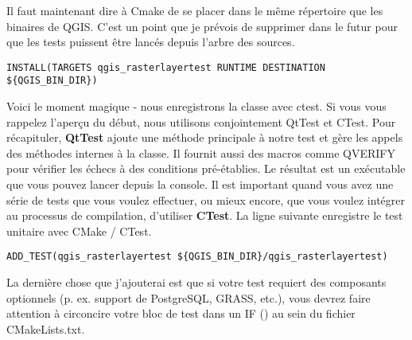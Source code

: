 Il faut maintenant dire \`a Cmake de se placer dans le m\^eme r\'epertoire que les binaires de QGIS. C'est un point que je pr\'evois de supprimer dans le futur pour que les tests puissent \^etre lanc\'es depuis l'arbre des sources.

\begin{verbatim}
INSTALL(TARGETS qgis_rasterlayertest RUNTIME DESTINATION ${QGIS_BIN_DIR})
\end{verbatim}

Voici le moment magique - nous enregistrons la classe avec ctest. Si vous vous rappelez l'aper\c{c}u du d\'ebut, nous utilisons conjointement QtTest et CTest. Pour r\'ecapituler, \textbf{QtTest} ajoute une m\'ethode principale \`a notre test et g\`ere les appels des m\'ethodes internes \`a la classe. Il fournit aussi des macros comme QVERIFY pour v\'erifier les \'echecs \`a des conditions pr\'e-\'etablies. Le r\'esultat est un ex\'ecutable que vous pouvez lancer depuis la console. Il est important quand vous avez une s\'erie de tests que vous voulez effectuer, ou mieux encore, que vous voulez int\'egrer au processus de compilation, d'utiliser \textbf{CTest}. La ligne suivante enregistre le test unitaire avec CMake / CTest.

\begin{verbatim}
ADD_TEST(qgis_rasterlayertest ${QGIS_BIN_DIR}/qgis_rasterlayertest)
\end{verbatim}

La derni\`ere chose que j'ajouterai est que si votre test requiert des composants optionnels (p. ex. support de PostgreSQL, GRASS, etc.), vous devrez faire attention \`a circoncire votre bloc de test dans un IF () au sein du fichier CMakeLists.txt.

